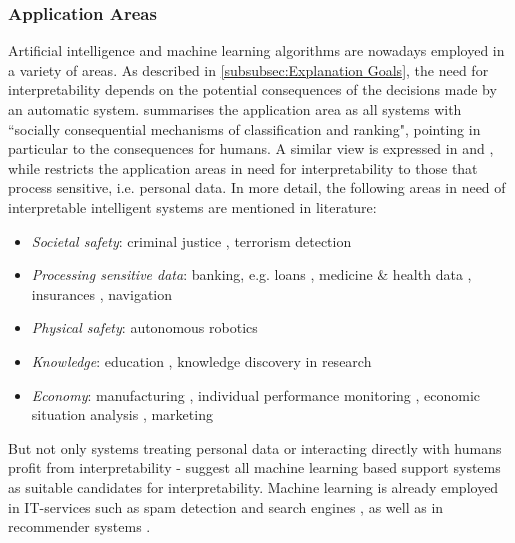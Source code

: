 \subsubsection{Application Areas}
\label{subsubsec:application_areas}
Artificial intelligence and machine learning algorithms are nowadays employed in a variety of areas. As described in \ref{subsubsec:Explanation Goals}, the need for interpretability depends on the potential consequences of the decisions made by an automatic system. \cite{burrell2016machine} summarises the application area as all systems with ``socially consequential mechanisms of classification and ranking", pointing in particular to the consequences for humans. A similar view is expressed in \cite{poursabzi2017manipulating} and \cite{ribeiro2016should}, while \cite{guidotti2018survey} restricts the application areas in need for interpretability to those that process sensitive, i.e. personal data. In more detail, the following areas in need of interpretable intelligent systems are mentioned in literature:
\begin{itemize}
	\item \textit{Societal safety}: criminal justice \cite{chen2018learning, poursabzi2017manipulating}, terrorism detection \cite{ribeiro2016should}	
	\item \textit{Processing sensitive data}: banking, e.g. loans \cite{burrell2016machine, chen2018learning, domingos2012few, gilpin2018explaining, poursabzi2017manipulating}, medicine \& health data \cite{chen2018learning, goodman16eu, guidotti2018survey, poursabzi2017manipulating, ribeiro2016should, richardson2018survey, ventocilla2018taxonomy}, insurances \cite{burrell2016machine, domingos2012few, guidotti2018survey}, navigation \cite{goodman16eu}
	\item \textit{Physical safety}: autonomous robotics \cite{guidotti2018survey, richardson2018survey}
	\item \textit{Knowledge}: education \cite{ventocilla2018taxonomy}, knowledge discovery in research \cite{guidotti2018survey}	
	\item \textit{Economy}: manufacturing \cite{ventocilla2018taxonomy}, individual performance monitoring \cite{goodman16eu}, economic situation analysis \cite{goodman16eu}, marketing \cite{burrell2016machine, domingos2012few, gilpin2018explaining}
\end{itemize}
But not only systems treating personal data or interacting directly with humans profit from interpretability - \cite{ventocilla2018taxonomy} suggest all machine learning based support systems as suitable candidates for interpretability. Machine learning is already employed in IT-services such as spam detection and search engines \cite{burrell2016machine, domingos2012few}, as well as in recommender systems \cite{gilpin2018explaining, richardson2018survey}.\newline
